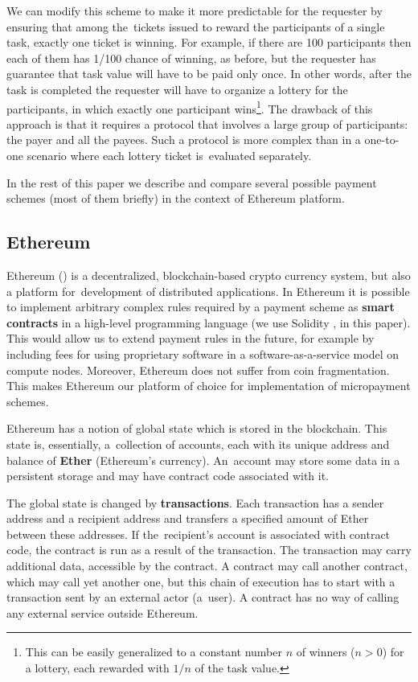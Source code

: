 \documentclass[a4paper]{article}
\begin{document}
    We can modify this scheme to make it more predictable for the requester by ensuring that among the~tickets issued
    to reward the participants of a single task, exactly one ticket is winning. For example, if there are 100
    participants then each of them has 1/100 chance of winning, as before, but the requester has guarantee that
    task value will have to be paid only once. In other words, after the task is completed the requester will have
    to organize a lottery for the participants, in which exactly one participant wins\footnote{This can be easily
    generalized to a constant number $n$ of winners ($n > 0$) for a lottery, each rewarded with $1/n$ of the task
    value.}.
    The drawback of this approach is that it requires a protocol that involves a large group of participants:
    the payer and all the payees.
    Such a protocol is more complex than in a one-to-one scenario where each lottery ticket is~evaluated separately.

    In the rest of this paper we describe and compare several possible payment schemes (most of them briefly) in the
    context of Ethereum platform.

\subsection{Ethereum}
    Ethereum (\cite{ETHEREUM}) is a decentralized, blockchain-based crypto currency system, but also a platform
    for~development of distributed applications. In Ethereum it is possible to implement arbitrary complex rules
    required by a payment scheme as \textbf{smart contracts} in a high-level programming language (we use Solidity
    \cite{SOLIDITY}, in this paper).
    This would allow us to extend payment rules in the future, for example by including fees for using
    proprietary software in a software-as-a-service model on compute nodes. Moreover, Ethereum does not suffer from
    coin fragmentation. This makes Ethereum our platform of choice for implementation of micropayment schemes.

    Ethereum has a notion of global state which is stored in the blockchain. This state is, essentially, a~collection
    of accounts, each with its unique address and balance of \textbf{Ether} (Ethereum's currency). An~account may store some
    data in a persistent storage and may have contract code associated with it.

    The global state is changed by \textbf{transactions}. Each transaction has a sender address and a recipient address and
    transfers a specified amount of Ether between these addresses. If the~recipient's account is associated with
    contract code, the contract is run as a result of the transaction. The transaction may carry additional data,
    accessible by the contract. A contract may call another contract, which may call yet another one, but this chain
    of execution has to start with a transaction sent by an external actor (a~user). A contract has no way of calling
    any external service outside Ethereum.
\end{document}
